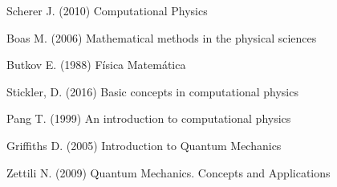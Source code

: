 \twocolumn

\begin{thebibliography}

  \bibitem[Scherer(2010)]{} Scherer J. (2010) Computational Physics

  \bibitem[Boas(2006)]{} Boas M. (2006) Mathematical methods in the physical sciences

  \bibitem[Butkov(1988)]{} Butkov E. (1988) Física Matemática

  \bibitem[Stickler(2016)]{} Stickler, D. (2016) Basic concepts in computational physics

  \bibitem[Pang (1999)]{} Pang T. (1999) An introduction to computational physics

  \bibitem[Griffiths(2005)]{} Griffiths D. (2005) Introduction to Quantum Mechanics

  \bibitem[Zettili(2010)]{} Zettili N. (2009) Quantum Mechanics. Concepts and Applications

\end{thebibliography}